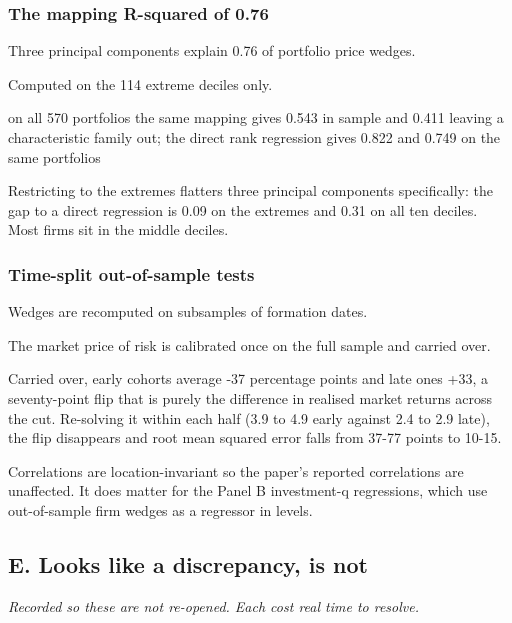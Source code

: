 \documentclass[11pt]{article}
\begin{document}
\subsubsection*{The mapping R-squared of 0.76}
\begin{description}[leftmargin=2.4cm,labelwidth=2.2cm,font=\normalfont\bfseries,style=sameline]
\item[Documented:] Three principal components explain 0.76 of portfolio price wedges.
\item[Implemented:] Computed on the 114 extreme deciles only.
\item[Evidence:] on all 570 portfolios the same mapping gives 0.543 in sample and 0.411 leaving a characteristic family out; the direct rank regression gives 0.822 and 0.749 on the same portfolios
\item[Why it matters:] Restricting to the extremes flatters three principal components specifically: the gap to a direct regression is 0.09 on the extremes and 0.31 on all ten deciles. Most firms sit in the middle deciles.
\end{description}
\subsubsection*{Time-split out-of-sample tests}
\begin{description}[leftmargin=2.4cm,labelwidth=2.2cm,font=\normalfont\bfseries,style=sameline]
\item[Documented:] Wedges are recomputed on subsamples of formation dates.
\item[Implemented:] The market price of risk is calibrated once on the full sample and carried over.
\item[Evidence:] Carried over, early cohorts average -37 percentage points and late ones +33, a seventy-point flip that is purely the difference in realised market returns across the cut. Re-solving it within each half (3.9 to 4.9 early against 2.4 to 2.9 late), the flip disappears and root mean squared error falls from 37-77 points to 10-15.
\item[Why it matters:] Correlations are location-invariant so the paper's reported correlations are unaffected. It does matter for the Panel B investment-q regressions, which use out-of-sample firm wedges as a regressor in levels.
\end{description}
\subsection*{E. Looks like a discrepancy, is not}
\emph{Recorded so these are not re-opened. Each cost real time to resolve.}
\end{document}
